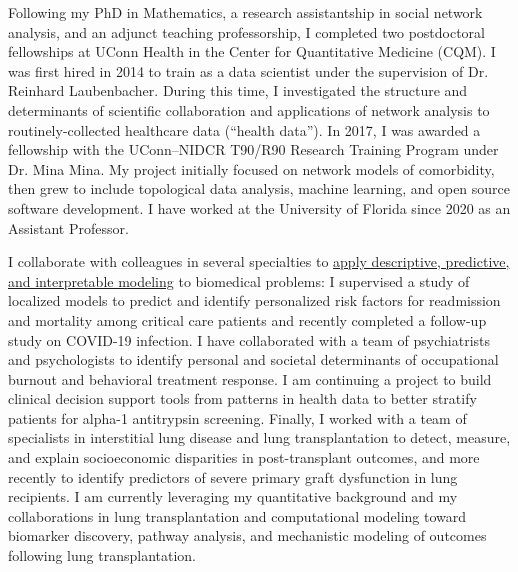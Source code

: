 \documentclass{nihbiosketch}
\begin{document}
\begin{statement}

Following my PhD in Mathematics, a research assistantship in social network analysis, and an adjunct teaching professorship, I completed two postdoctoral fellowships at UConn Health in the Center for Quantitative Medicine (CQM).
I was first hired in 2014 to train as a data scientist under the supervision of Dr. Reinhard Laubenbacher.
During this time, I investigated the structure and determinants of scientific collaboration and applications of network analysis to routinely-collected healthcare data (``health data'').
In 2017, I was awarded a fellowship with the UConn--NIDCR T90/R90 Research Training Program under Dr. Mina Mina.
My project initially focused on network models of comorbidity, then grew to include topological data analysis, machine learning, and open source software development.
I have worked at the University of Florida since 2020 as an Assistant Professor.



I collaborate with colleagues in several specialties to \uline{apply descriptive, predictive, and interpretable modeling} to biomedical problems:
I supervised a study of localized models to predict and identify personalized risk factors for readmission and mortality among critical care patients and recently completed a follow-up study on COVID-19 infection.
I have collaborated with a team of psychiatrists and psychologists to identify personal and societal determinants of occupational burnout and behavioral treatment response.
I am continuing a project to build clinical decision support tools from patterns in health data to better stratify patients for alpha-1 antitrypsin screening.
Finally, I worked with a team of specialists in interstitial lung disease and lung transplantation to detect, measure, and explain socioeconomic disparities in post-transplant outcomes, and more recently to identify predictors of severe primary graft dysfunction in lung recipients.
I am currently leveraging my quantitative background and my collaborations in lung transplantation and computational modeling toward biomarker discovery, pathway analysis, and mechanistic modeling of outcomes following lung transplantation.


\end{statement}
\end{document}
